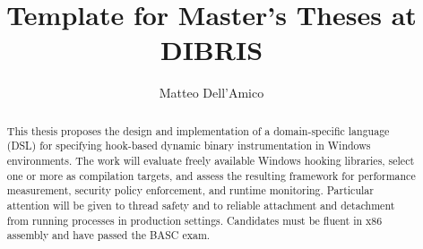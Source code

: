 \documentclass{masterthesis}
\begin{document}
\title{Template for Master's Theses at DIBRIS}

\author{Matteo Dell'Amico}



\maketitle

\begin{abstract}
This thesis proposes the design and implementation of a domain-specific language (DSL) for specifying hook-based dynamic binary instrumentation in Windows environments. The work will evaluate freely available Windows hooking libraries, select one or more as compilation targets, and assess the resulting framework for performance measurement, security policy enforcement, and runtime monitoring. Particular attention will be given to thread safety and to reliable attachment and detachment from running processes in production settings. Candidates must be fluent in x86 assembly and have passed the BASC exam.
\end{abstract}

\tableofcontents





% 







\nocite{*}
\printbibliography
% 
% 
\end{document}

